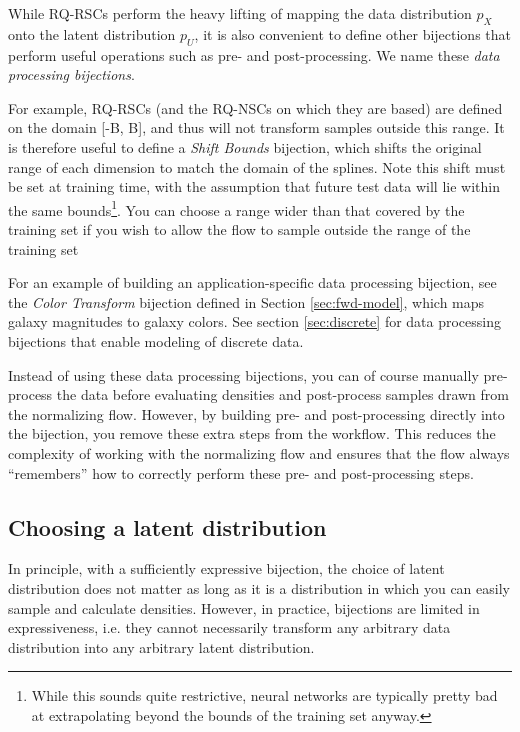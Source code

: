 \documentclass[twocolumn,twocolappendix,linenumbers]{aastex631}
\newcommand{\px}{p^{}_{X}}
\newcommand{\pu}{p^{}_{U}}
\begin{document}
While RQ-RSCs perform the heavy lifting of mapping the data distribution $\px$ onto the latent distribution $\pu$, it is also convenient to define other bijections that perform useful operations such as pre- and post-processing.
We name these \emph{data processing bijections}.

For example, RQ-RSCs (and the RQ-NSCs on which they are based) are defined on the domain [-B, B], and thus will not transform samples outside this range.
It is therefore useful to define a \emph{Shift Bounds} bijection, which shifts the original range of each dimension to match the domain of the splines.
Note this shift must be set at training time, with the assumption that future test data will lie within the same bounds\footnote{While this sounds quite restrictive, neural networks are typically pretty bad at extrapolating beyond the bounds of the training set anyway.}.
You can choose a range wider than that covered by the training set if you wish to allow the flow to sample outside the range of the training set

For an example of building an application-specific data processing bijection, see the \emph{Color Transform} bijection defined in Section \ref{sec:fwd-model}, which maps galaxy magnitudes to galaxy colors.
See section \ref{sec:discrete} for data processing bijections that enable modeling of discrete data.

Instead of using these data processing bijections, you can of course manually pre-process the data before evaluating densities and post-process samples drawn from the normalizing flow.
However, by building pre- and post-processing directly into the bijection, you remove these extra steps from the workflow.
This reduces the complexity of working with the normalizing flow and ensures that the flow always ``remembers'' how to correctly perform these pre- and post-processing steps.


\subsection{Choosing a latent distribution}
\label{sec:latent}

In principle, with a sufficiently expressive bijection, the choice of latent distribution does not matter as long as it is a distribution in which you can easily sample and calculate densities.
However, in practice, bijections are limited in expressiveness, i.e. they cannot necessarily transform any arbitrary data distribution into any arbitrary latent distribution.
\end{document}

